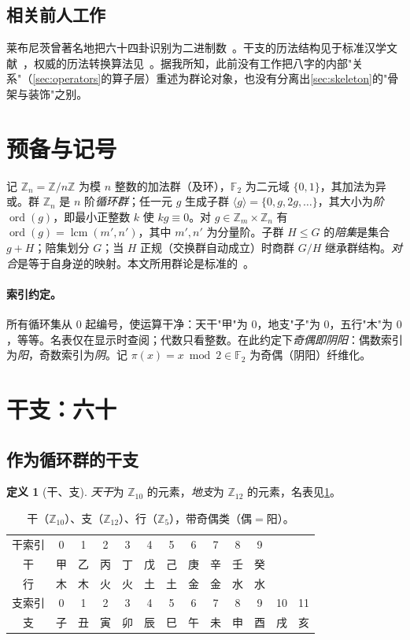 \documentclass[11pt,a4paper,fontset=none]{ctexart}
\theoremstyle{definition}
\newtheorem{definition}[theorem]{定义}
\theoremstyle{remark}
\DeclareMathOperator{\lcm}{lcm}
\newcommand{\Z}{\mathbb{Z}}
\newcommand{\F}{\mathbb{F}}
\newcommand{\ord}{\operatorname{ord}}
\begin{document}
\subsection{相关前人工作}
莱布尼茨曾著名地把六十四卦识别为二进制数~\cite{leibniz1703}。干支的历法结构见于标准汉学文献~\cite{smith2008,needham1959}，权威的历法转换算法见~\cite{dershowitz}。据我所知，此前没有工作把八字的内部"关系"（\cref{sec:operators}的算子层）重述为群论对象，也没有分离出\cref{sec:skeleton}的"骨架与装饰"之别。

\section{预备与记号}\label{sec:prelim}
记 $\Z_n=\Z/n\Z$ 为模 $n$ 整数的加法群（及环），$\F_2$ 为二元域 $\{0,1\}$，其加法为异或。群 $\Z_n$ 是 $n$ 阶\emph{循环群}；任一元 $g$ 生成子群 $\langle g\rangle=\{0,g,2g,\dots\}$，其大小为\emph{阶} $\ord(g)$，即最小正整数 $k$ 使 $kg\equiv0$。对 $g\in\Z_m\times\Z_n$ 有 $\ord(g)=\lcm(m',n')$，其中 $m',n'$ 为分量阶。子群 $H\le G$ 的\emph{陪集}是集合 $g+H$；陪集划分 $G$；当 $H$ 正规（交换群自动成立）时商群 $G/H$ 继承群结构。\emph{对合}是等于自身逆的映射。本文所用群论是标准的~\cite{dummitfoote}。

\paragraph{索引约定。} 所有循环集从 $0$ 起编号，使运算干净：天干"甲"为 $0$，地支"子"为 $0$，五行"木"为 $0$，等等。名表仅在显示时查阅；代数只看整数。在此约定下\emph{奇偶即阴阳}：偶数索引为\emph{阳}，奇数索引为\emph{阴}。记 $\pi(x)=x\bmod 2\in\F_2$ 为奇偶（阴阳）纤维化。

\section{干支：六十}\label{sec:ganzhi}

\subsection{作为循环群的干支}
\begin{definition}[干、支]
\emph{天干}为 $\Z_{10}$ 的元素，\emph{地支}为 $\Z_{12}$ 的元素，名表见\cref{tab:names}。
\end{definition}

\begin{table}[h]\centering
\caption{干（$\Z_{10}$）、支（$\Z_{12}$）、行（$\Z_5$），带奇偶类（偶$=$阳）。\label{tab:names}}
\small
\begin{tabular}{c|cccccccccccc}
干索引 & 0 & 1 & 2 & 3 & 4 & 5 & 6 & 7 & 8 & 9 & & \\
干 & 甲 & 乙 & 丙 & 丁 & 戊 & 己 & 庚 & 辛 & 壬 & 癸 & & \\
行 & 木 & 木 & 火 & 火 & 土 & 土 & 金 & 金 & 水 & 水 & & \\ \midrule
支索引 & 0 & 1 & 2 & 3 & 4 & 5 & 6 & 7 & 8 & 9 & 10 & 11 \\
支 & 子 & 丑 & 寅 & 卯 & 辰 & 巳 & 午 & 未 & 申 & 酉 & 戌 & 亥
\end{tabular}
\end{table}
\end{document}
